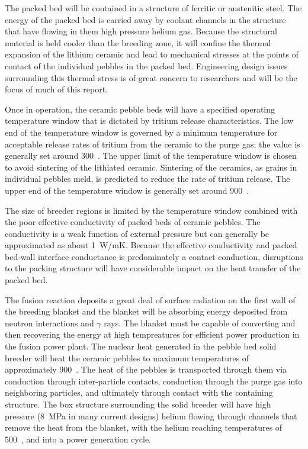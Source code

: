 The packed bed will be contained in a structure of ferritic or austenitic steel. The energy of the packed bed is carried away by coolant channels in the structure that have flowing in them high pressure helium gas. Because the structural material is held cooler than the breeding zone, it will confine the thermal expansion of the lithium ceramic and lead to mechanical stresses at the points of contact of the individual pebbles in the packed bed. Engineering design issues surrounding this thermal stress is of great concern to researchers and will be the focus of much of this report.

Once in operation, the ceramic pebble beds will have a specified operating temperature window that is dictated by tritium release characteristics. The low end of the temperature window is governed by a minimum temperature for acceptable release rates of tritium from the ceramic to the purge gas; the value is generally set around 300~\celsius. The upper limit of the temperature window is chosen to avoid sintering of the lithiated ceramic. Sintering of the ceramics, as grains in individual pebbles meld, is predicted to reduce the rate of tritium release. The upper end of the temperature window is generally set around 900~\celsius.

The size of breeder regions is limited by the temperature window combined with the poor effective conductivity of packed beds of ceramic pebbles. The conductivity is a weak function of external pressure but can generally be approximated as about \si{1 W/{mK}}. Because the effective conductivity and packed bed-wall interface conductance is predominately a contact conduction, disruptions to the packing structure will have considerable impact on the heat transfer of the packed bed.

The fusion reaction deposits a great deal of surface radiation on the first wall of the breeding blanket and the blanket will be absorbing energy deposited from neutron interactions and $\gamma$ rays. The blanket must be capable of converting and then recovering the energy at high tempreatures for efficient power production in the fusion power plant. The nuclear heat generated in the pebble bed solid breeder will heat the ceramic pebbles to maximum temperatures of approximately 900~\celsius. The heat of the pebbles is transported through them via conduction through inter-particle contacts, conduction through the purge gas into neighboring particles, and ultimately through contact with the containing structure. The box structure surrounding the solid breeder will have high pressure (\si{8~MPa} in many current designs) helium flowing through channels that remove the heat from the blanket, with the helium reaching temperatures of 500~\celsius, and into a power generation cycle.